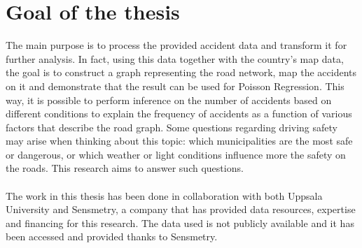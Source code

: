 
\section{Goal of the thesis}
The main purpose is to process the provided accident data and transform it for further analysis. In fact, using this data together with the country's map data, the goal is to construct a graph representing the road network, map the accidents on it and demonstrate that the result can be used for Poisson Regression. This way, it is possible to perform inference on the number of accidents based on different conditions to explain the frequency of accidents as a function of various factors that describe the road graph. Some questions regarding driving safety may arise when thinking about this topic: which municipalities are the most safe or dangerous, or which weather or light conditions influence more the safety on the roads. This research aims to answer such questions.
\\
\\ 
The work in this thesis has been done in collaboration with both Uppsala University and
Sensmetry, a company that has provided data resources, expertise and financing for this research.
The data used is not publicly available and it has been accessed and provided thanks to
Sensmetry.
